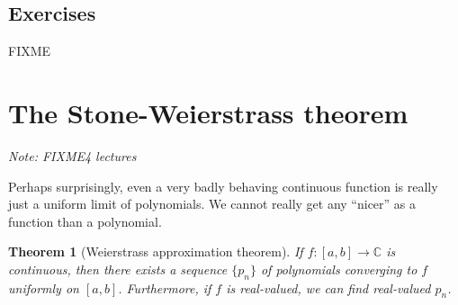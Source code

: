 \documentclass[12pt]{book}
\newcommand{\C}{{\mathbb{C}}}
\newcommand{\sectionnotes}[1]{\noindent \emph{Note: #1} \medskip \par}
\newcommand{\sectionnewpage}{\clearpage}
\theoremstyle{plain}
\newtheorem{thm}{Theorem}[section]
\theoremstyle{remark}
\theoremstyle{definition}
\theoremstyle{exercise}
\theoremstyle{example}
\begin{document}
\subsection{Exercises}

FIXME


\sectionnewpage
\section{The Stone-Weierstrass theorem}
\label{sec:FIXME}

\sectionnotes{FIXME4 lectures}

\medskip

Perhaps surprisingly, even a very badly behaving continuous function is really
just a uniform limit of polynomials.  We cannot really get any ``nicer'' as
a function than a polynomial.


\begin{thm}[Weierstrass approximation theorem]
If $f \colon [a,b] \to \C$ is continuous, then there exists a sequence $\{
p_n \}$ of polynomials converging to $f$ uniformly on $[a,b]$.
Furthermore, if $f$ is real-valued, we can find real-valued $p_n$.
\end{thm}

\end{document}
